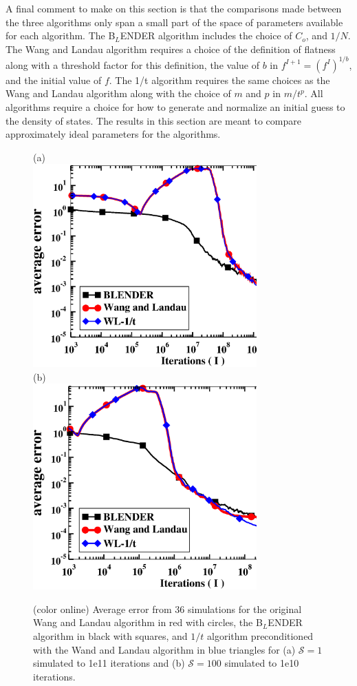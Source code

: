 \documentclass[aps,pre,reprint,superscriptaddress,showkeys]{revtex4-2}
\begin{document}
  A final comment to make on this section is that the comparisons made between the three algorithms only span a small part of the space of parameters available for each algorithm.  The B$_L$ENDER algorithm includes the choice of $C_o$, and $1/N$. The Wang and Landau algorithm requires a choice of the definition of flatness along with a threshold factor for this definition, the value of $b$ in $f^{I+1}= (f^I)^{1/b}$, and  the initial value of $f$. The 1/t algorithm requires the same choices as the Wang and Landau algorithm along with the choice of $m$ and $p$ in $m/t^p$. All algorithms require a choice for how to generate and normalize an initial guess to the density of states.  The results in this section are meant to compare approximately ideal parameters for the algorithms. 
\begin{figure}[h!]
(a)\\
\includegraphics[width=8.6cm]{fig4a.eps}\\
(b)\\
\includegraphics[width=8.6cm]{fig4b.eps}\\
\caption{(color online) Average error from 36 simulations for the original Wang and Landau algorithm in red with circles, the B$_L$ENDER  algorithm in black with squares, and $1/t$ algorithm preconditioned with the Wand and Landau algorithm in blue triangles for (a) $\mathcal{S}=1$ simulated to 1e11 iterations and (b) $\mathcal{S}=100$ simulated to 1e10 iterations. \label{compare_blender_wl}}
\end{figure}
\end{document}
